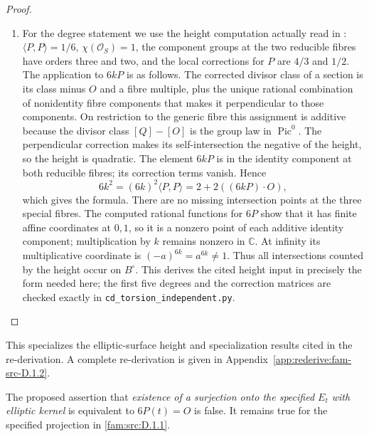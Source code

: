 \begin{proof}
\begin{enumerate}[label=\arabic*.,leftmargin=*]
\item For the degree statement we use the height computation actually read in
\cite[Lemma 2.1 and proof]{Engel2026}: \(\langle P,P\rangle=1/6\),
\(\chi(\mathcal O_S)=1\), the component groups at the two reducible fibres
have orders three and two, and the local corrections for \(P\) are
\(4/3\) and \(1/2\). The application to \(6kP\) is as follows.
The corrected divisor class of a section is its class minus \(O\) and
a fibre multiple, plus the unique rational combination of nonidentity
fibre components that makes it perpendicular to those components.
On restriction to the generic fibre this assignment is additive because
the divisor class \([Q]-[O]\) is the group law in \(\operatorname{Pic}^0\).
The perpendicular correction makes its self-intersection the negative of
the height, so the height is quadratic. The element \(6kP\) is in the
identity component at both reducible fibres; its correction terms vanish.
Hence
\[
 6k^2=(6k)^2\langle P,P\rangle
 =2+2((6kP)\mathbin{\cdot}O),
\]
which gives the formula. There are no missing intersection points at the
three special fibres. The computed rational functions for \(6P\) show
that it has finite affine coordinates at \(0,1\), so it is a nonzero point
of each additive identity component; multiplication by \(k\) remains
nonzero in \(\mathbb C\). At infinity its multiplicative coordinate is
\((-a)^{6k}=a^{6k}\ne1\). Thus all intersections counted by the height
occur on \(B^\circ\). This derives the cited height input in precisely
the form needed here; the first five degrees and the correction matrices
are checked exactly in \texttt{cd\_torsion\_independent.py}.
\end{enumerate}
\end{proof}



This specializes the elliptic-surface height and specialization results cited in the re-derivation. A complete re-derivation is given in Appendix~\ref{app:rederive:fam-src-D.1.2}.


\begin{theorem}[counterexample]\hypertarget{tag-01QT}{}\label{fam:src:D.1.3}\label{fam:st:D.1.3}

The proposed assertion that \emph{existence of a surjection onto the
specified \(E_t\) with elliptic kernel} is equivalent to \(6P(t)=O\)
is false. It remains true for the specified projection in \ref{fam:src:D.1.1}.
\end{theorem}



